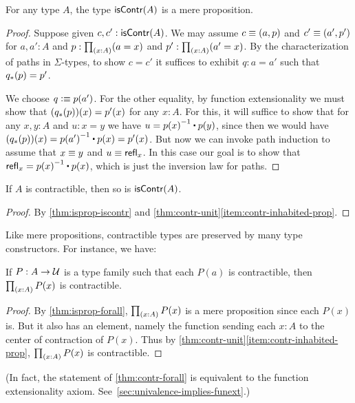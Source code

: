\begin{lem}\label{thm:isprop-iscontr}
  For any type $A$, the type $\mathsf{isContr}(A)$ is a mere proposition.
\end{lem}
\begin{proof}
  Suppose given $c,c':\mathsf{isContr}(A)$.
  We may assume $c\equiv(a,p)$ and $c'\equiv(a',p')$ for $a,a':A$ and $p:\prd{x:A} (a=x)$ and $p':\prd{x:A} (a'=x)$.
  By the characterization of paths in $\Sigma$-types, to show $c=c'$ it suffices to exhibit $q:a=a'$ such that ${q}_{*}\mathopen{}\left({p}\right)\mathclose{}=p'$.

  We choose $q\vcentcolon\equiv p(a')$.
  For the other equality, by function extensionality we must show that $({q}_{*}\mathopen{}\left({p}\right)\mathclose{})(x)=p'(x)$ for any $x:A$.
  For this, it will suffice to show that for any $x,y:A$ and $u:x=y$ we have $u= \opp{p(x)} \ct p(y)$, since then we would have $(\trans q p)(x) = \opp{p(a')} \ct p(x) = p'(x)$.
  But now we can invoke path induction to assume that $x\equiv y$ and $u\equiv \mathsf{refl}_{x}$.
  In this case our goal is to show that $\refl x = \opp{p(x)} \ct p(x)$, which is just the inversion law for paths.
\end{proof}

\begin{cor}\label{thm:contr-contr}
  If $A$ is contractible, then so is $\mathsf{isContr}(A)$.
\end{cor}
\begin{proof}
  By \autoref{thm:isprop-iscontr} and \autoref{thm:contr-unit}\ref{item:contr-inhabited-prop}.
\end{proof}

Like mere propositions, contractible types are preserved by many type constructors.
For instance, we have:

\begin{lem}\label{thm:contr-forall}
  If $P:A\to\mathcal{U}$ is a type family such that each $P(a)$ is contractible, then $\prd{x:A} P(x)$ is contractible.
\end{lem}
\begin{proof}
  By \autoref{thm:isprop-forall}, $\prd{x:A} P(x)$ is a mere proposition since each $P(x)$ is.
  But it also has an element, namely the function sending each $x:A$ to the center of contraction of $P(x)$.
  Thus by \autoref{thm:contr-unit}\ref{item:contr-inhabited-prop}, $\prd{x:A} P(x)$ is contractible.
\end{proof}

(In fact, the statement of \autoref{thm:contr-forall} is equivalent to the function extensionality axiom.
See~\autoref{sec:univalence-implies-funext}.)

